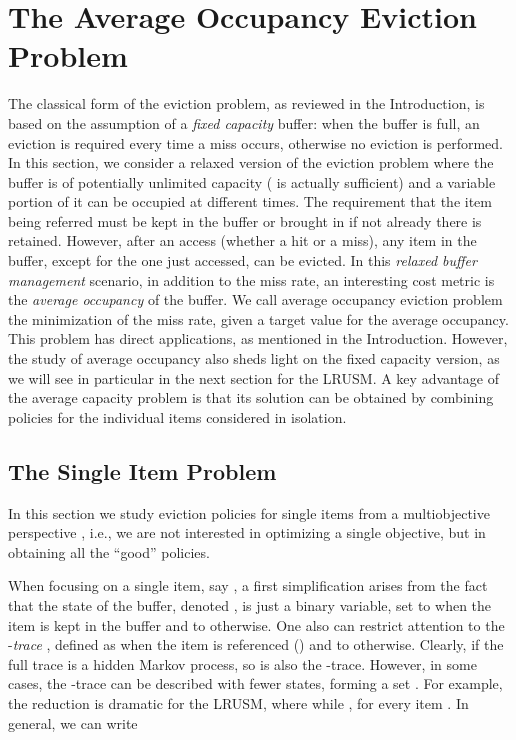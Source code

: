 \documentclass[11pt,a4paper]{article}
\theoremstyle{definition}
\theoremstyle{remark}
\begin{document}
\section{The Average Occupancy Eviction Problem}
\label{sec:relax-buff-manag}

The classical form of the eviction problem, as reviewed in the
Introduction, is based on the assumption of a \emph{fixed capacity}
buffer: when the buffer is full, an eviction is required every time a
miss occurs, otherwise no eviction is performed. In this section, we
consider a relaxed version of the eviction problem where the buffer
is of potentially unlimited capacity ( is actually sufficient)
and a variable portion of it can be occupied at different times. The
requirement that the item being referred must be kept in the buffer or
brought in if not already there is retained. However, after an access
(whether a hit or a miss), any item in the buffer, except for the one
just accessed, can be evicted. In this \emph{relaxed buffer
management} scenario, in addition to the miss rate, an interesting
cost metric is the \emph{average occupancy} of the buffer.  We call
average occupancy eviction problem the minimization of the miss
rate, given a target value for the average occupancy. This problem has
direct applications, as mentioned in the Introduction. However, the
study of average occupancy also sheds light on the fixed capacity
version, as we will see in particular in the next section for the
LRUSM.  A key advantage of the average capacity problem is that its
solution can be obtained by combining policies for the individual
items considered in isolation.


\subsection{The Single Item Problem}
\label{sec:one-item-eviction}

In this section we study eviction policies for single items from a
multiobjective perspective \cite{Ehrgott05,Miettinen99}, i.e., we are not
interested in optimizing a single objective, but in obtaining all the ``good''
policies.

When focusing on a single item, say , a first simplification
arises from the fact that the state of the buffer, denoted
, is just a binary variable, set to  when the item is
kept in the buffer and to  otherwise.  One also can restrict
attention to the -\emph{trace} , defined as 
when the item is referenced () and to  otherwise.
Clearly, if the full trace  is a hidden Markov process, so is
also the -trace. However, in some cases, the -trace
can be described with fewer states, forming a set . For
example, the reduction is dramatic for the LRUSM, where  while
, for every item . In general, we can write
\end{document}
